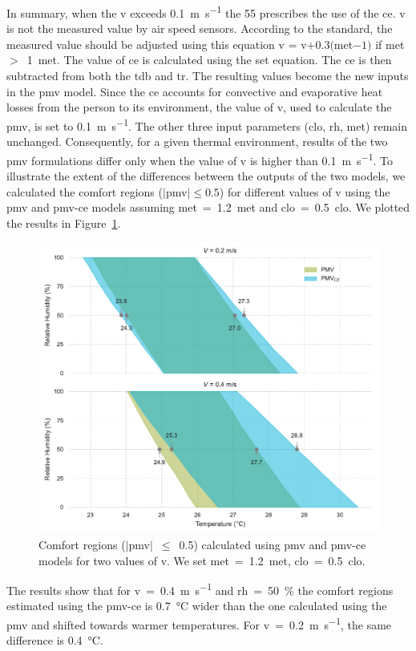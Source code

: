 In summary, when the \ac{v} exceeds \qty{0.1}{\m\per\s} the \gls{55} prescribes the use of the \ac{ce}.
\ac{v} is not the measured value by air speed sensors.
According to the standard, the measured value should be adjusted using this equation \ac{v} = \ac{v}$+ 0.3 ($\acs{met}$-1)$ if \ac{met}~$>$~\qty{1}{met}.
The value of \ac{ce} is calculated using the \ac{set} equation.
The \ac{ce} is then subtracted from both the \ac{tdb} and \ac{tr}.
The resulting values become the new inputs in the \ac{pmv} model.
Since the \ac{ce} accounts for convective and evaporative heat losses from the person to its environment, the value of \ac{v}, used to calculate the \ac{pmv}, is set to \qty{0.1}{\m\per\s}.
The other three input parameters (\ac{clo}, \ac{rh}, \ac{met}) remain unchanged.
Consequently, for a given thermal environment, results of the two \ac{pmv} formulations differ only when the value of \ac{v} is higher than \qty{0.1}{\m\per\s}.
To illustrate the extent of the differences between the outputs of the two models, we calculated the comfort regions ($\mid$\ac{pmv}$\mid \leq 0.5$) for different values of \ac{v} using the \ac{pmv} and \ac{pmv-ce} models assuming \ac{met}~=~\qty{1.2}{met} and \ac{clo}~=~\qty{0.5}{clo}.
We plotted the results in Figure~\ref{fig:comfort_regios_pmv_pmvce}.
\begin{figure}[!htb]
    \centering
    \includegraphics[width=1\textwidth]{figures/pmv_comfort_regions}
    \caption{Comfort regions ($|$\ac{pmv}$|$~$\leq$~\num{0.5}) calculated using \ac{pmv} and \ac{pmv-ce} models for two values of \ac{v}.
    We set \ac{met}~=~\qty{1.2}{met}, \ac{clo}~=~\qty{0.5}{clo}.
    \label{fig:comfort_regios_pmv_pmvce}}
\end{figure}
The results show that for \ac{v}~=~\qty{0.4}{\m\per\s} and \ac{rh}~=~\qty{50}{\percent} the comfort regions estimated using the \ac{pmv-ce} is \qty{0.7}{\celsius} wider than the one calculated using the \ac{pmv} and shifted towards warmer temperatures.
For \ac{v}~=~\qty{0.2}{\m\per\s}, the same difference is \qty{0.4}{\celsius}.

